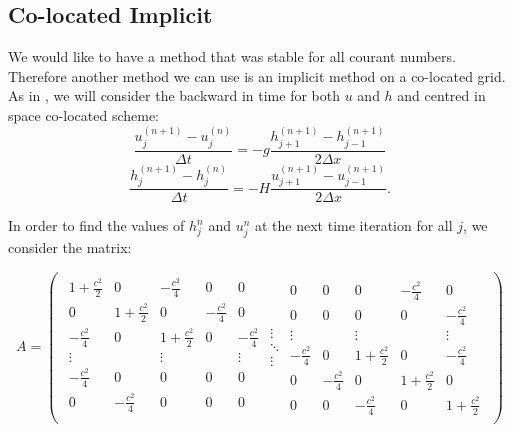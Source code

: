 \documentclass[a4paper,12pt, notitlepage]{article}
\begin{document}
\subsection{Co-located Implicit}
We would like to have a method that was stable for all courant numbers. Therefore another method we can use is an implicit method on a co-located grid. As in \cite{MPE textbook}, we will consider the backward in time for both $u$ and $h$ and centred in space co-located scheme:
\begin{equation} \label{FTimplicitAgrid1}
\frac{u_{j}^{(n+1)} - u_{j}^{(n)}}{\Delta t} = -g \frac{h_{j+1}^{(n+1)} - h_{j-1}^{(n+1)}}{2\Delta x}
\end{equation}
\begin{equation}\label{FTimplicitAgrid2}
\frac{h_{j}^{(n+1)} - h_{j}^{(n)}}{\Delta t} = -H \frac{u_{j+1}^{(n+1)} - u_{j-1}^{(n+1)}}{2\Delta x}.
\end{equation}

In order to find the values of $h_{j}^{n}$ and $u_{j}^{n}$ at the next time iteration for all $j$, we consider the matrix:

\[
A = \left (
\begin{array}{ccc}
\begin{array}{ccccc}
1 + \frac{c^{2}}{2} & 0 & -\frac{c^{2}}{4} & 0 & 0\\
0& 1 + \frac{c^{2}}{2} & 0 & -\frac{c^{2}}{4} & 0\\
-\frac{c^{2}}{4} & 0& 1 + \frac{c^{2}}{2} & 0 & -\frac{c^{2}}{4}\\
\vdots & & \vdots & & \vdots\\
- \frac{c^{2}}{4} & 0 & 0 & 0 & 0\\
0 & - \frac{c^{2}}{4} & 0 & 0 & 0\\
\end{array}
\begin{array}{c}
\vdots\\ 
\ddots\\
\vdots
\end{array}
\begin{array}{ccccc}
0 & 0 & 0 & - \frac{c^{2}}{4} & 0\\
0 & 0 & 0 & 0 & - \frac{c^{2}}{4}\\
\vdots & & \vdots & & \vdots\\
-\frac{c^{2}}{4}& 0 & 1 + \frac{c^{2}}{2} & 0 & -\frac{c^{2}}{4} \\
0 & -\frac{c^{2}}{4} & 0 & 1 + \frac{c^{2}}{2} & 0\\
0 & 0 & -\frac{c^{2}}{4}& 0 & 1 + \frac{c^{2}}{2}
\end{array}
\end{array}
\right )
\]
\end{document}

